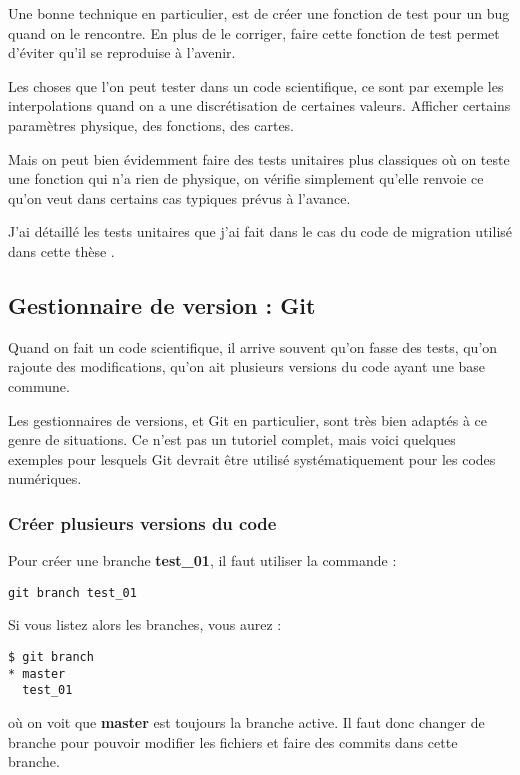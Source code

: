 \begin{remarque}
Une bonne technique en particulier, est de créer une fonction de test pour un bug quand on le rencontre. En plus de le corriger, faire cette fonction de test permet d'éviter qu'il se reproduise à l'avenir. 
\end{remarque}

Les choses que l'on peut tester dans un code scientifique, ce sont par exemple les interpolations quand on a une discrétisation de certaines valeurs. Afficher certains paramètres physique, des fonctions, des cartes. 

Mais on peut bien évidemment faire des tests unitaires plus classiques où on teste une fonction qui n'a rien de physique, on vérifie simplement qu'elle renvoie ce qu'on veut dans certains cas typiques prévus à l'avance. 

J'ai détaillé les tests unitaires que j'ai fait dans le cas du code de migration utilisé dans cette thèse .

\subsection{Gestionnaire de version : Git}
Quand on fait un code scientifique, il arrive souvent qu'on fasse des tests, qu'on rajoute des modifications, qu'on ait plusieurs versions du code ayant une base commune. 

Les gestionnaires de versions, et Git en particulier, sont très bien adaptés à ce genre de situations. Ce n'est pas un tutoriel complet, mais voici quelques exemples pour lesquels Git devrait être utilisé systématiquement pour les codes numériques.

\subsubsection{Créer plusieurs versions du code}
Pour créer une branche \textbf{test\_01}, il faut utiliser la commande :
\begin{verbatim}
git branch test_01
\end{verbatim}

Si vous listez alors les branches, vous aurez :
\begin{verbatim}
$ git branch
* master
  test_01
\end{verbatim}
où on voit que \textbf{master} est toujours la branche active. Il faut donc changer de branche pour pouvoir modifier les fichiers et faire des commits dans cette branche.

